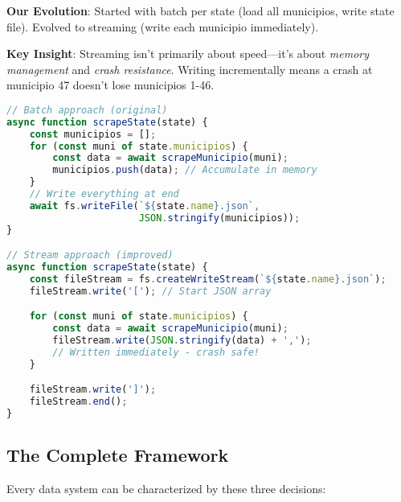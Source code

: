 \documentclass[11pt,a4paper]{article}
\begin{document}
\textbf{Our Evolution}: Started with batch per state (load all municipios, write state file). Evolved to streaming (write each municipio immediately).

\textbf{Key Insight}: Streaming isn't primarily about speed—it's about \textit{memory management} and \textit{crash resistance}. Writing incrementally means a crash at municipio 47 doesn't lose municipios 1-46.

\begin{lstlisting}[language=JavaScript,caption={Batch vs Stream scraping}]
// Batch approach (original)
async function scrapeState(state) {
    const municipios = [];
    for (const muni of state.municipios) {
        const data = await scrapeMunicipio(muni);
        municipios.push(data); // Accumulate in memory
    }
    // Write everything at end
    await fs.writeFile(`${state.name}.json`,
                       JSON.stringify(municipios));
}

// Stream approach (improved)
async function scrapeState(state) {
    const fileStream = fs.createWriteStream(`${state.name}.json`);
    fileStream.write('['); // Start JSON array

    for (const muni of state.municipios) {
        const data = await scrapeMunicipio(muni);
        fileStream.write(JSON.stringify(data) + ',');
        // Written immediately - crash safe!
    }

    fileStream.write(']');
    fileStream.end();
}
\end{lstlisting}

\subsection{The Complete Framework}

Every data system can be characterized by these three decisions:

\begin{center}
\end{center}
\end{document}
